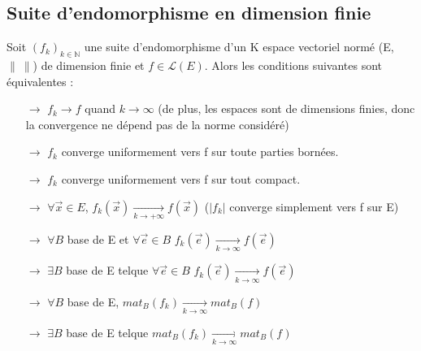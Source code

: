 \subsection{Suite d'endomorphisme en dimension finie}
\begin{prop}
Soit $(f_k)_{k \in \mathbb{N}}$ une suite d'endomorphisme d'un K espace vectoriel normé (E,$\parallel~\parallel$) de dimension finie et $f \in \mathcal{L}(E)$. Alors les conditions suivantes sont équivalentes : 
\begin{itemize}
 \item[$\rightarrow$] $f_k \rightarrow f$ quand $k \rightarrow \infty$ (de plus, les espaces sont de dimensions finies, donc la convergence ne dépend pas de la norme considéré)
 \item[$\rightarrow$] $f_k$ converge uniformement vers f sur toute parties bornées.
 \item[$\rightarrow$] $f_k$ converge uniformement vers f sur tout compact.
 \item[$\rightarrow$] $\forall \overrightarrow{x} \in E$, $f_k(\overrightarrow{x}) \underset{k \rightarrow +\infty}\rightarrow f(\overrightarrow{x})$ ($|f_k|$ converge simplement vers f sur E)
 \item[$\rightarrow$] $\forall B$ base de E et $\forall \overrightarrow{e} \in B$ $f_k(\overrightarrow{e}) \underset{k\rightarrow \infty}\rightarrow f(\overrightarrow{e})$
 \item[$\rightarrow$] $\exists B$ base de E telque $\forall \overrightarrow{e} \in B$ $f_k(\overrightarrow{e}) \underset{k\rightarrow \infty}\rightarrow f(\overrightarrow{e})$
 \item[$\rightarrow$] $\forall B$ base de E, $mat_B(f_k) \underset{k\rightarrow \infty}\rightarrow mat_B(f)$
 \item[$\rightarrow$] $\exists B$ base de E telque $mat_B(f_k) \underset{k\rightarrow \infty}\rightarrow mat_B(f)$
\end{itemize}
\end{prop}
